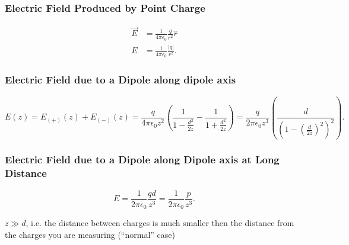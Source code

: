 \subsubsection{Electric Field Produced by Point Charge}
\begin{align*}
  \Vec{E} &= \frac{1}{4 \pi \epsilon_0} \frac{q}{r^2} \hat{r} \\
  E &= \frac{1}{4 \pi \epsilon_0} \frac{\left| q \right|}{r^2}
.\end{align*}

\begin{symbols}
\end{symbols}


\subsubsection{Electric Field due to a Dipole along dipole axis}
\begin{equation*}
  E(z) = E_{(+)}(z) + E_{(-)}(z) = \frac{q}{4\pi \epsilon_0 z^2} \left( \frac{1}{1 - \frac{d^2}{2z}} - \frac{1}{1 + \frac{d^2}{2z}} \right) = \frac{q}{2\pi \epsilon_0 z^3} \left( \frac{d}{\left( 1 - \left( \frac{d}{2z} \right)^2 \right)^2} \right)
.\end{equation*}

\begin{symbols}
\end{symbols}

\subsubsection{Electric Field due to a Dipole along Dipole axis at Long Distance}
\begin{equation*}
  E = \frac{1}{2\pi \epsilon_0} \frac{qd}{z^3} = \frac{1}{2 \pi \epsilon_0} \frac{p}{z^3}
.\end{equation*}

\begin{assumptions}
  \item $z \gg d$, i.e. the distance between charges is much smaller then the distance from the charges you are measuring (``normal'' case)
\end{assumptions}

\begin{symbols}
\end{symbols}

